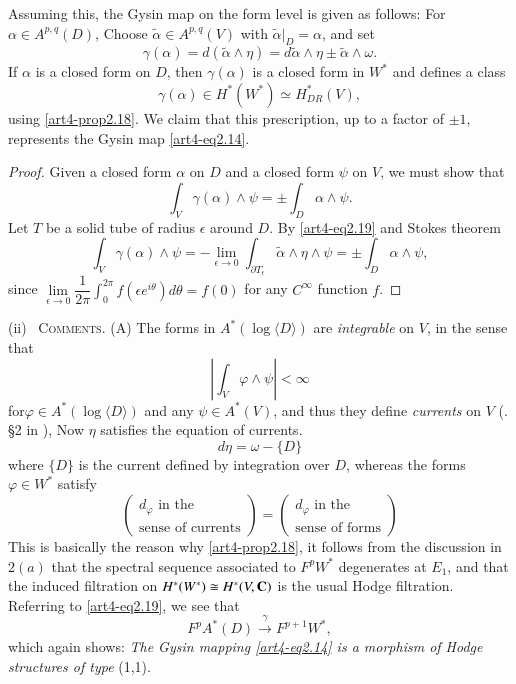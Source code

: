 Assuming this, the Gysin map on the form level is given as follows: For $\alpha \in A^{p,q} (D)$, Choose $\tilde{\alpha} \in A^{p,q} (V)$ with $\tilde{\alpha}|_D = \alpha$, and set
\setcounter{equation}{18}
\begin{equation}
\gamma(\alpha) = d (\tilde{\alpha} \wedge \eta) = d \tilde{\alpha} \wedge \eta \pm \tilde{\alpha} \wedge \omega. \label{art4-eq2.19}
\end{equation}
If $\alpha$ is a closed form on $D$, then $\gamma (\alpha)$ is a closed form in $W^\ast$ and defines a class
$$
\gamma (\alpha) \in H^\ast  (W^\ast) \simeq H^\ast_{DR} (V),
$$
using \eqref{art4-prop2.18}. We claim that this prescription, up to a factor of $\pm 1$, represents the Gysin map \eqref{art4-eq2.14}.

\begin{proof}
Given a closed form $\alpha$ on $D$ and a closed form $\psi$ on $V$, we must show that
$$
\int_V \gamma (\alpha) \wedge \psi = \pm \int_D \alpha \wedge \psi.
$$
Let $T$ be a solid tube of radius $\epsilon$ around $D$. By \eqref{art4-eq2.19} and Stokes theorem
$$
\int_V \gamma (\alpha) \wedge \psi = - \lim\limits_{\epsilon \to 0} \int_{\partial T_\epsilon} \tilde{\alpha} \wedge \eta \wedge \psi = \pm \int_D \alpha \wedge \psi,
$$
since $\lim\limits_{\epsilon \to 0} \dfrac{1}{2 \pi} \int^{2\pi}_0 f (\epsilon e^{i\theta}) d\theta = f (0)$ for any $C^\infty$ function $f$.
\end{proof}

\medskip
\noindent
(ii)~ \textsc{Comments.} (A) The forms in $A^\ast (\log \langle D \rangle)$ are \textit{integrable} on $V$, in the sense that
$$
|\int_V \varphi \wedge \psi| < \infty
$$
for\pageoriginale $\varphi \in A^\ast (\log \langle D \rangle)$ and any $\psi\in A^\ast (V)$, and thus they define \textit{currents} on $V$ (\cf. \S 2 in \cite{art4-key18}), Now $\eta$ satisfies the equation of currents.
$$
d \eta = \omega - \{D\}
$$
where $\{D\}$ is the current defined by integration over $D$, whereas the forms $\varphi \in W^\ast$ satisfy
$$
\begin{pmatrix}
d_\varphi \text{ in the }\\
\text{sense of currents}
\end{pmatrix} = 
\begin{pmatrix}
d_\varphi \text{ in the}\\
\text{sense of forms}
\end{pmatrix}
$$
This is basically the reason why \eqref{art4-prop2.18}, it follows from the discussion in $2 (a)$ that the spectral sequence associated to $F^p W^\ast$ degenerates at $E_1$, and that the induced filtration on $H^\ast (W^\ast) \cong H^\ast(V,\mathbf{C})$ is the usual Hodge filtration. Referring to \eqref{art4-eq2.19}, we see that
$$
F^p A^\ast (D) \xrightarrow{\gamma} F^{p+1} W^\ast,
$$
which again shows: \textit{The Gysin mapping \eqref{art4-eq2.14} is a morphism of Hodge structures of type} (1,1).

